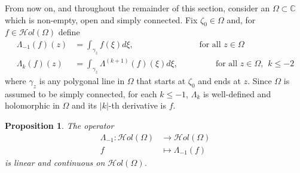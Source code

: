 \documentclass[11pt,twoside,a4paper]{article}
\newtheorem{proposition}[theorem]{Proposition}
\theoremstyle{remark}
\newcommand{\hol}{{\mathcal Hol}}
\begin{document}
From now on, and throughout the remainder of this section, consider an $\Omega \subset \mathbb{C}$ which is non-empty, open and simply connected. Fix $\zeta_0 \in \Omega$ and, for $f \in \hol(\Omega)$ define
\begin{align*}
\Lambda_{-1}(f)(z)&= \int_{\gamma_z}f(\xi) d\xi, \hspace{90pt} \text{ for all } z \in \Omega  \\
\Lambda_{k}(f)(z)&= \int_{\gamma_z}\Lambda^{(k+1)}(f)(\xi) d\xi, \hspace{50pt} \text{ for all } z \in \Omega, \hspace{5pt} k \leq -2
\end{align*}
where $\gamma_{z}$ is any polygonal line in $\Omega $ that starts at $\zeta_0$ and ends at $z$. Since $\Omega $ is assumed to be simply connected, for each $k \leq -1$, $\Lambda_{k}$ is well-defined and holomorphic in $\Omega$ and its $|k|$-th derivative is $f$.
\begin{proposition}
\label{integraliscontinuous}
  The operator
  \begin{align*}
  \Lambda_{-1}: \hol(\Omega)&\longrightarrow \hol(\Omega)\\
  f& \mapsto \Lambda_{-1}(f)
  \end{align*}
  is linear and continuous on $\hol(\Omega)$.
\end{proposition}
\end{document}
